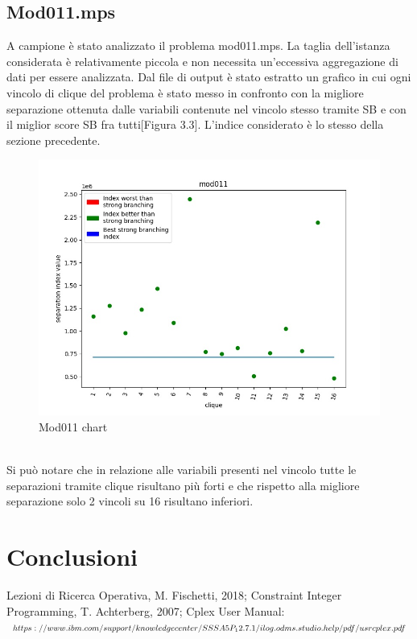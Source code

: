 \documentclass[12pt,a4paper,twoside,openright]{book}
\begin{document}
\section{Mod011.mps}
A campione è stato analizzato il problema mod011.mps. La taglia dell'istanza considerata è relativamente piccola
e non necessita un'eccessiva aggregazione di dati per essere analizzata. Dal file di output è stato estratto un grafico
in cui ogni vincolo di clique del problema è stato messo in confronto con la migliore separazione ottenuta dalle variabili
contenute nel vincolo stesso tramite SB e con il miglior score SB fra tutti[Figura 3.3]. L'indice considerato è lo stesso 
della sezione precedente.\\
\begin{figure}[ht]
    \centering
    \includegraphics [scale = 0.7]{chart_exp1_mod011}
    \caption{Mod011 chart}
    \label{fig:mod011}
\end{figure}\\
Si può notare che in relazione alle variabili presenti nel vincolo tutte le separazioni tramite clique risultano più forti 
e che rispetto alla migliore separazione solo 2 vincoli su 16 risultano inferiori. 
\\
\chapter{Conclusioni}
\renewcommand{\bibname}{Bibliografia/Sitografia}
\begin{thebibliography}{100}
    \bibitem{} Lezioni di Ricerca Operativa, M. Fischetti, 2018;
    \bibitem{} Constraint Integer Programming, T. Achterberg, 2007;
    \bibitem{} Cplex User Manual: \\ 
    $https://www.ibm.com/support/knowledgecenter/SSSA5P_12.7.1/
    \\ilog.odms.studio.help/pdf/usrcplex.pdf$
\end{thebibliography}
\end{document}
